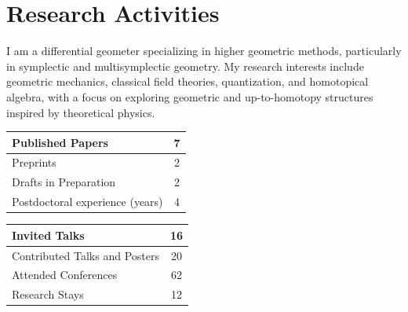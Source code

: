 \documentclass[a4paper]{article}
\newcommand{\txt}[1]{#1\\}
\begin{document}
	\clearpage
	\section*{Research Activities}

	\txt{I am a differential geometer specializing in higher geometric methods, particularly in symplectic and multisymplectic geometry. My research interests include geometric mechanics, classical field theories, quantization, and homotopical algebra, with a focus on exploring geometric and up-to-homotopy structures inspired by theoretical physics. }
	
		\begin{minipage}[t]{0.45\columnwidth}
		\center
	\begin{tabularx}{\linewidth}{|X|c|}
	\hline
	
	Published Papers & 7 \\
	\hline
	
	Preprints & 2 \\
	\hline
	
	Drafts in Preparation & 2 \\
	\hline
	
	Postdoctoral experience (years) & 4 \\
	\hline
	
	\end{tabularx}
		\end{minipage} 
		\hfill	
		\begin{minipage}[t]{0.45\columnwidth}
		\center
	\begin{tabularx}{\linewidth}{|X|c|}
	\hline
	
	Invited Talks & 16 \\
	\hline
	
	Contributed Talks and Posters & 20 \\
	\hline
	
	Attended Conferences & 62 \\
	\hline
	

	
	Research Stays & 12 \\
	\hline
	
	\end{tabularx}
		\end{minipage} 	
	\vspace{1em}	
	
	
	
\end{document}
